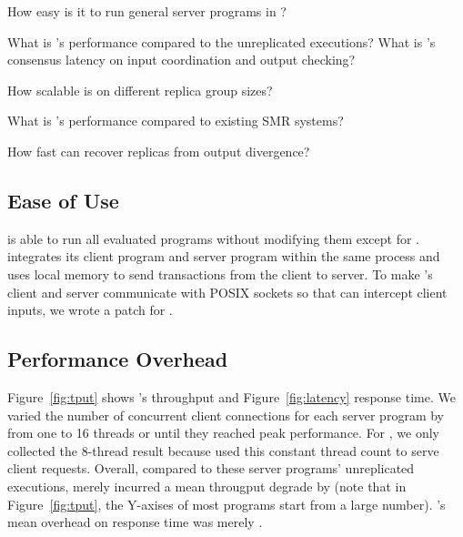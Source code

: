 \begin{tightenum}

\item[\S\ref{sec:ease-of-use}:] How easy is it to run general server programs 
in \xxx?

\item[\S\ref{sec:overhead}:] What is \xxx's performance compared to the 
unreplicated executions? What is \xxx's consensus latency on input coordination 
and output checking?

\item[\S\ref{sec:scalability}:] How scalable is \xxx on different replica group 
sizes?

\item[\S\ref{sec:compare}:] What is \xxx's performance compared to existing 
SMR systems?

\item[\S\ref{sec:robust}:] How fast can \xxx recover replicas from output 
divergence?



\end{tightenum}

\subsection{Ease of Use} \label{sec:ease-of-use}

\xxx is able to run all \nprog evaluated programs without modifying them except 
for \calvin. \calvin integrates its client program and server program within the 
same process and uses local memory to send transactions from the client to 
server. To make \calvin's client and server communicate with POSIX sockets so 
that \xxx can intercept client inputs, we wrote a \nlinescalvin patch for 
\calvin.

\subsection{Performance Overhead} \label{sec:overhead}

Figure~\ref{fig:tput} shows \xxx's throughput and Figure~\ref{fig:latency} 
response time. We varied the number of concurrent client connections for each 
server program by from one to 16 threads or until they reached peak performance. 
For \calvin, we only collected the 8-thread result because \calvin used this 
constant thread count to serve client requests. Overall, compared to these 
server programs' unreplicated executions, \xxx merely incurred a mean 
througput degrade by \tputoverhead (note that in Figure~\ref{fig:tput}, the 
Y-axises of most programs start from a large number). \xxx's mean overhead on 
response time was merely \latencyoverhead.

